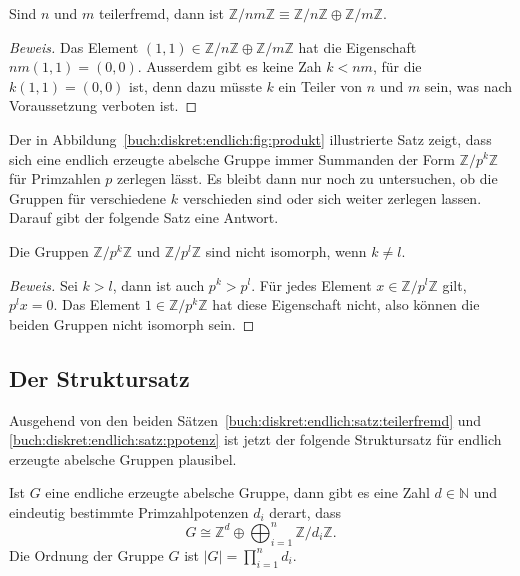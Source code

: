 \begin{satz}
\label{buch:diskret:endlich:satz:teilerfremd}
Sind $n$ und $m$ teilerfremd, dann ist
$
\mathbb{Z}/nm\mathbb{Z}
\equiv
\mathbb{Z}/n\mathbb{Z} \oplus \mathbb{Z}/m\mathbb{Z}
$.
\end{satz}

\begin{proof}[Beweis]
Das Element $(1,1)\in \mathbb{Z}/n\mathbb{Z}\oplus\mathbb{Z}/m\mathbb{Z}$
hat die Eigenschaft $nm(1,1)=(0,0)$.
Ausserdem gibt es keine Zah $k<nm$, für die $k(1,1)=(0,0)$ ist, denn
dazu müsste $k$ ein Teiler von $n$ und $m$ sein, was nach Voraussetzung
verboten ist.
\end{proof}

Der in Abbildung~\ref{buch:diskret:endlich:fig:produkt} illustrierte
Satz zeigt, dass sich eine endlich erzeugte abelsche Gruppe immer
Summanden der Form $\mathbb{Z}/p^k\mathbb{Z}$ für Primzahlen $p$
zerlegen lässt.
Es bleibt dann nur noch zu untersuchen, ob die Gruppen für verschiedene
$k$ verschieden sind oder sich weiter zerlegen lassen.
Darauf gibt der folgende Satz eine Antwort.

\begin{satz}
\label{buch:diskret:endlich:satz:ppotenz}
Die Gruppen $\mathbb{Z}/p^k\mathbb{Z}$ und $\mathbb{Z}/p^l\mathbb{Z}$
sind nicht isomorph, wenn $k\ne l$.
\end{satz}

\begin{proof}[Beweis]
Sei $k>l$, dann ist  auch $p^k>p^l$.
Für jedes Element $x \in \mathbb{Z}/p^l\mathbb{Z}$ gilt, 
$p^lx=0$.
Das Element $1\in \mathbb{Z}/p^k\mathbb{Z}$ hat diese Eigenschaft
nicht, also können die beiden Gruppen nicht isomorph sein.
\end{proof}

%
%
\subsection{Der Struktursatz
\label{buch:diskret:endlich:subsection:}}
Ausgehend von den beiden Sätzen~\ref{buch:diskret:endlich:satz:teilerfremd}
und
\ref{buch:diskret:endlich:satz:ppotenz}
ist jetzt der folgende Struktursatz für endlich erzeugte abelsche
Gruppen plausibel.

\begin{satz}
\label{buch:diskret:endlich:struktursatz}
Ist $G$ eine endliche erzeugte abelsche Gruppe, dann gibt es eine
Zahl $d\in\mathbb{N}$ und eindeutig bestimmte Primzahlpotenzen $d_i$
derart, dass
\[
G
\cong
\mathbb{Z}^d
\oplus
\bigoplus_{i=1}^n
\mathbb{Z}/d_i\mathbb{Z}.
\]
Die Ordnung der Gruppe $G$ ist $|G|=\prod_{i=1}^n d_i$.
\end{satz}

